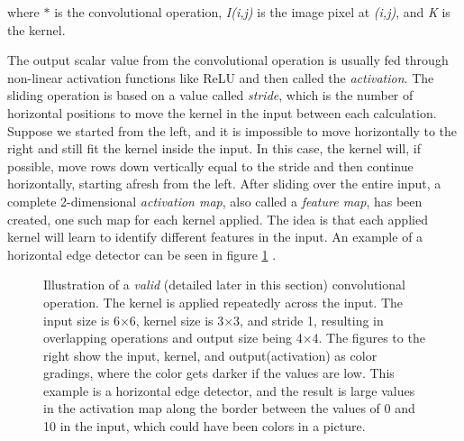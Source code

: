      where $*$ is the convolutional operation, \textit{I(i,j)} is the image pixel at \textit{(i,j)}, and \textit{K} is the kernel.
     
    The output scalar value from the convolutional operation is usually fed through non-linear activation functions like ReLU and then called the \textit{activation}. The sliding operation is based on a value called \textit{stride}, which is the number of horizontal positions to move the kernel in the input between each calculation. Suppose we started from the left, and it is impossible to move horizontally to the right and still fit the kernel inside the input. In this case, the kernel will, if possible, move rows down vertically equal to the stride and then continue horizontally, starting afresh from the left. After sliding over the entire input, a complete 2-dimensional \textit{activation map}, also called a \textit{feature map}, has been created, one such map for each kernel applied. The idea is that each applied kernel will learn to identify different features in the input. An example of a horizontal edge detector can be seen in figure \ref{convolutional_fig} \cite{o2015introduction_convolutions}. 
    \clearpage
    \begin{figure}[H]
        \centering
                
        \caption[Horizontal edge detector example]{Illustration of a \textit{valid} (detailed later in this section) convolutional operation. The kernel is applied repeatedly across the input. The input size is 6×6, kernel size is 3×3, and stride 1, resulting in overlapping operations and output size being 4×4. The figures to the right show the input, kernel, and output(activation) as color gradings, where the color gets darker if the values are low. This example is a horizontal edge detector, and the result is large values in the activation map along the border between the values of 0 and 10 in the input, which could have been colors in a picture.}
      	\medskip 
        \label{convolutional_fig}
    \end{figure}
    
